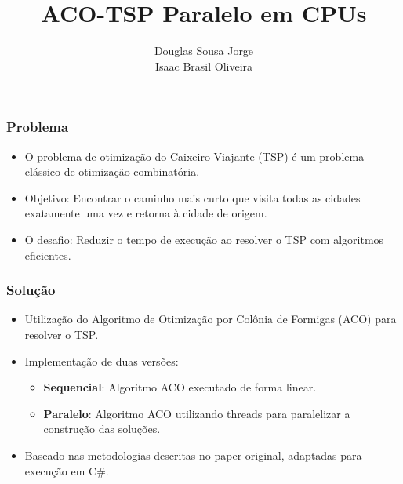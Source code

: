 \documentclass{beamer}
\title{ACO-TSP Paralelo em CPUs}
\author{Douglas Sousa Jorge\\Isaac Brasil Oliveira}
\date{}
\begin{document}
\frame{\titlepage}

\begin{frame}
\frametitle{Problema}
\begin{itemize}
    \item O problema de otimização do Caixeiro Viajante (TSP) é um problema clássico de otimização combinatória.
    \item Objetivo: Encontrar o caminho mais curto que visita todas as cidades exatamente uma vez e retorna à cidade de origem.
    \item O desafio: Reduzir o tempo de execução ao resolver o TSP com algoritmos eficientes.
\end{itemize}
\end{frame}

\begin{frame}
\frametitle{Solução}
\begin{itemize}
    \item Utilização do Algoritmo de Otimização por Colônia de Formigas (ACO) para resolver o TSP.
    \item Implementação de duas versões:
    \begin{itemize}
        \item \textbf{Sequencial}: Algoritmo ACO executado de forma linear.
        \item \textbf{Paralelo}: Algoritmo ACO utilizando threads para paralelizar a construção das soluções.
    \end{itemize}
    \item Baseado nas metodologias descritas no paper original, adaptadas para execução em C\#.
\end{itemize}
\end{frame}
\end{document}
